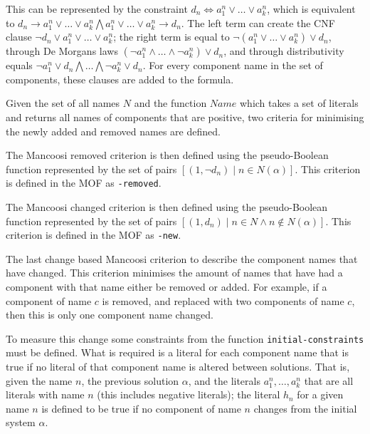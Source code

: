 This can be represented by the constraint $d_n \Leftrightarrow a^n_1 \vee \ldots \vee a^n_k$, which
is equivalent to $d_n \rightarrow a^n_1 \vee \ldots \vee a^n_k \bigwedge a^n_1 \vee \ldots \vee a^n_k \rightarrow d_n$.
The left term can create the CNF clause $\neg d_n \vee a^n_1 \vee \ldots \vee a^n_k$;
the right term is equal to $\neg(a^n_1 \vee \ldots \vee a^n_k) \vee d_n$,
through De Morgans laws $(\neg a^n_1 \wedge \ldots \wedge \neg a^n_k) \vee d_n$,
and through distributivity equals $\neg a^n_1 \vee d_n \bigwedge \ldots \bigwedge \neg a^n_k \vee d_n$.      
For every component name in the set of components, these clauses are added to the formula.


Given the set of all names $N$ and the function $Name$ which takes a set of literals and returns all names of components that are positive,
two criteria for minimising the newly added and removed names are defined.
\begin{defs}
The Mancoosi removed criterion is then defined using the pseudo-Boolean function
represented by the set of pairs $[(1,\neg d_n) \mid n \in N(\alpha)]$.
This criterion is defined in the MOF as \verb+-removed+.
\end{defs}

\begin{defs}
The Mancoosi changed criterion is then defined using the pseudo-Boolean function
 represented by the set of pairs $[(1,d_n) \mid n \in N \wedge n \not \in N(\alpha)]$.
This criterion is defined in the MOF as \verb+-new+.
\end{defs}

The last change based Mancoosi criterion to describe the component names that have changed.
This criterion minimises the amount of names that have had a component with that name either be removed or added.
For example, if a component of name $c$ is removed, and replaced with two components of name $c$, then this is only one component name changed.

To measure this change some constraints from the function \verb+initial-constraints+ must be defined.
What is required is a literal for each component name that is true if no literal of that component name is altered between solutions.
That is, given the name $n$, the previous solution $\alpha$, and the literals $a^n_1, \ldots , a^n_k$ that are all literals with name $n$ (this includes negative literals);
the literal $h_n$ for a given name $n$ is defined to be true if no component of name $n$ changes from the initial system $\alpha$.


